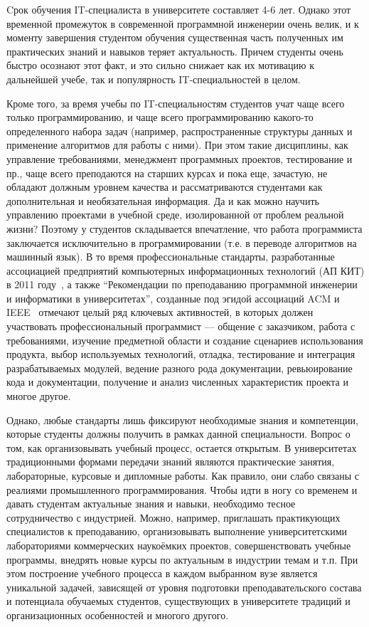 \documentclass[a4paper]{article}
\begin{document}
Cрок обучения IT-специалиста в университете составляет 4-6 лет. Однако этот временной промежуток  в современной программной инженерии очень велик, и к моменту завершения студентом обучения существенная часть полученных им практических знаний и навыков теряет актуальность. Причем студенты очень быстро осознают этот факт, и это сильно снижает как их мотивацию к дальнейшей учебе, так и популярность IT-специальностей в целом. 

Кроме того, за время учебы по IT-специальностям студентов учат чаще всего только программированию, и чаще всего программированию  какого-то определенного набора задач (например, распространенные структуры данных и применение алгоритмов для работы с ними). При этом такие дисциплины, как управление требованиями, менеджмент программных проектов, тестирование и пр., чаще всего преподаются на старших курсах и пока еще, зачастую, не обладают должным уровнем качества и рассматриваются студентами как дополнительная и необязательная информация. Да и как можно научить управлению проектами в учебной среде, изолированной от проблем реальной жизни? Поэтому у студентов складывается впечатление, что работа программиста заключается исключительно в программировании  (т.е. в переводе алгоритмов на машинный язык). В то время профессиональные стандарты, разработанные ассоциацией предприятий компьютерных информационных технологий (АП КИТ) в 2011 году~\cite{apkit}, а также ``Рекомендации по преподаванию программной инженерии и информатики в университетах'', созданные под эгидой ассоциаций ACM и  IEEE~\cite{curriculum, terekhov2} отмечают целый ряд ключевых активностей, в которых должен участвовать профессиональный программист --- общение с заказчиком, работа с требованиями, изучение предметной области и создание сценариев использования продукта, выбор используемых технологий, отладка, тестирование и интеграция разрабатываемых модулей, ведение разного рода документации, ревьюирование кода и документации, получение и анализ численных характеристик проекта и многое другое. 

Однако, любые стандарты лишь фиксируют необходимые знания и компетенции, которые студенты должны получить в рамках данной специальности. Вопрос о том, как организовывать учебный процесс, остается открытым. В университетах традиционными формами передачи знаний  являются практические занятия, лабораторные, курсовые и дипломные работы. Как правило, они слабо связаны с реалиями промышленного программирования. Чтобы идти в ногу со временем и давать студентам актуальные знания и навыки, необходимо тесное сотрудничество с индустрией. Можно, например, приглашать практикующих специалистов к преподаванию, организовывать выполнение университетскими лабораториями коммерческих наукоёмких  проектов, совершенствовать учебные программы, внедрять новые курсы по актуальным в индустрии темам и т.п. При этом построение учебного процесса в каждом выбранном вузе является уникальной задачей, зависящей от уровня подготовки преподавательского состава и потенциала обучаемых студентов, существующих в университете традиций и организационных особенностей и многого другого. 
\end{document}
